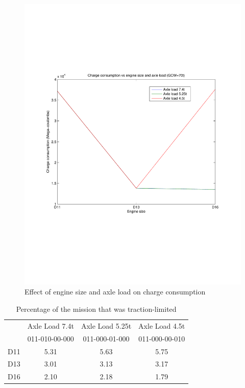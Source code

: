 \documentclass{article}
\begin{document}
\begin{figure}[h!]
\centering
\includegraphics[width=0.5\linewidth, clip=true, trim=45 185 65 208]{Figures/Effect_of_axle_load/Charge_consumption_vs_axle_number_and_axle_load.pdf}
\caption{Effect of engine size and axle load on charge consumption}
\label{chargeEngineSizeAxleLoad}
\end{figure}

\begin{table}[h!]                                       
\centering                                              
\begin{tabular}{|c|c|c|c|}                              
\hline                                                  
 & Axle Load 7.4t & Axle Load 5.25t & Axle Load 4.5t \\
 & 011-010-00-000 & 011-000-01-000 & 011-000-00-010 \\
\hline                                                  
D11 & 5.31 & 5.63 & 5.75 \\                            
\hline                                                  
D13 & 3.01 & 3.13 & 3.17 \\ 
\hline                              
D16 & 2.10 & 2.18 & 1.79 \\                                
\hline                                                  
\end{tabular}                                           
\caption{Percentage of the mission that was traction-limited}                                
\label{table:tractionLimitMode}                              
\end{table}  
\end{document}
